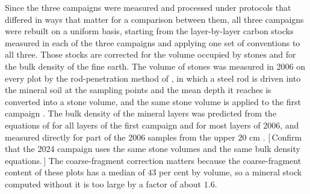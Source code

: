 \documentclass[11pt]{article}
\newcommand{\gap}[1]{\textcolor{red!70!black}{\small[\,#1\,]}}
\begin{document}
Since the three campaigns were measured and processed under protocols that differed in
ways that matter for a comparison between them, all three campaigns were rebuilt on a
uniform basis, starting from the layer-by-layer carbon stocks measured in each of the three
campaigns and applying one set of conventions to all three. Those stocks are corrected for
the volume occupied by stones and for the bulk density of the fine earth. The volume of
stones was measured in 2006 on every plot by the rod-penetration method of
\citet{Viro1952}, in which a steel rod is driven into the mineral soil at the sampling
points and the mean depth it reaches is converted into a stone volume, and the same stone
volume is applied to the first campaign \citep{Lehtonen2016,Kramarenko}. The bulk density of
the mineral layers was predicted from the equations of \citet{TamminenStarr1994} for all
layers of the first campaign and for most layers of 2006, and measured directly for part of
the 2006 samples from the upper $20$ cm \citep{Kramarenko}. \gap{Confirm that the 2024
campaign uses the same stone volumes and the same bulk density equations.} The
coarse-fragment correction matters because the coarse-fragment content of these plots has a
median of $43$ per cent by volume, so a mineral stock computed without it is too large by a
factor of about $1.6$.
\end{document}

